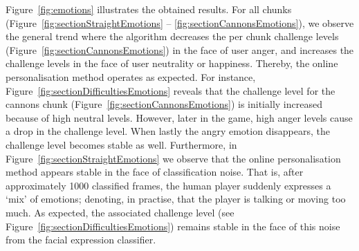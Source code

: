 \documentclass[letterpaper]{article}
\begin{document}
Figure~\ref{fig:emotions} illustrates the obtained results. For all chunks (Figure~\ref{fig:sectionStraightEmotions} -- \ref{fig:sectionCannonsEmotions}), we observe the general trend where the algorithm decreases the per chunk challenge levels (Figure~\ref{fig:sectionCannonsEmotions}) in the face of user anger, and increases the challenge levels in the face of user neutrality or happiness. Thereby, the online personalisation method operates as expected. For instance, Figure~\ref{fig:sectionDifficultiesEmotions} reveals that the challenge level for the cannons chunk (Figure~\ref{fig:sectionCannonsEmotions}) is initially increased because of high neutral levels. However, later in the game, high anger levels cause a drop in the challenge level. When lastly the angry emotion disappears, the challenge level becomes stable as well. Furthermore, in Figure~\ref{fig:sectionStraightEmotions} we observe that the online personalisation method appears stable in the face of classification noise. That is, after approximately 1000 classified frames, the human player suddenly expresses a `mix' of emotions; denoting, in practise, that the player is talking or moving too much. As expected, the associated challenge level (see Figure~\ref{fig:sectionDifficultiesEmotions}) remains stable in the face of this noise from the facial expression classifier.
\end{document}
